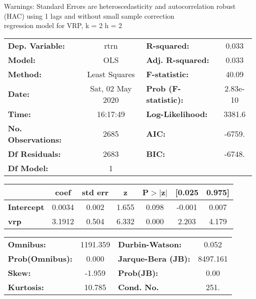 Warnings: \newline
 [1] Standard Errors are heteroscedasticity and autocorrelation robust (HAC) using 1 lags and without small sample correction\\ 

regression model for VRP, k = 2 h = 2\begin{center}
\begin{tabular}{lclc}
\toprule
\textbf{Dep. Variable:}    &       rtrn       & \textbf{  R-squared:         } &     0.033   \\
\textbf{Model:}            &       OLS        & \textbf{  Adj. R-squared:    } &     0.033   \\
\textbf{Method:}           &  Least Squares   & \textbf{  F-statistic:       } &     40.09   \\
\textbf{Date:}             & Sat, 02 May 2020 & \textbf{  Prob (F-statistic):} &  2.83e-10   \\
\textbf{Time:}             &     16:17:49     & \textbf{  Log-Likelihood:    } &    3381.6   \\
\textbf{No. Observations:} &        2685      & \textbf{  AIC:               } &    -6759.   \\
\textbf{Df Residuals:}     &        2683      & \textbf{  BIC:               } &    -6748.   \\
\textbf{Df Model:}         &           1      & \textbf{                     } &             \\
\bottomrule
\end{tabular}
\begin{tabular}{lcccccc}
                   & \textbf{coef} & \textbf{std err} & \textbf{z} & \textbf{P$> |$z$|$} & \textbf{[0.025} & \textbf{0.975]}  \\
\midrule
\textbf{Intercept} &       0.0034  &        0.002     &     1.655  &         0.098        &       -0.001    &        0.007     \\
\textbf{vrp}       &       3.1912  &        0.504     &     6.332  &         0.000        &        2.203    &        4.179     \\
\bottomrule
\end{tabular}
\begin{tabular}{lclc}
\textbf{Omnibus:}       & 1191.359 & \textbf{  Durbin-Watson:     } &    0.052  \\
\textbf{Prob(Omnibus):} &   0.000  & \textbf{  Jarque-Bera (JB):  } & 8497.161  \\
\textbf{Skew:}          &  -1.959  & \textbf{  Prob(JB):          } &     0.00  \\
\textbf{Kurtosis:}      &  10.785  & \textbf{  Cond. No.          } &     251.  \\
\bottomrule
\end{tabular}
\end{center}

